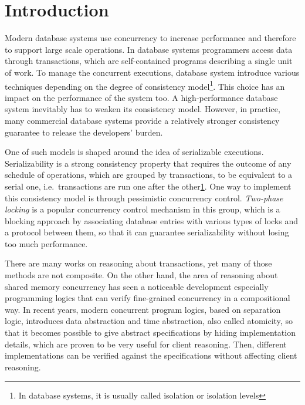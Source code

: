 \chapter{Introduction}

Modern database systems use concurrency to increase performance and therefore to support large scale operations. In database systems programmers access data through transactions, which are self-contained programs describing a single unit of work. To manage the concurrent executions, database system introduce various techniques depending on the degree of consistency model\footnote{In database systems, it is usually called isolation or isolation levels}. This choice has an impact on the performance of the system too. A high-performance database system inevitably has to weaken its consistency model. However, in practice, many commercial database systems provide a relatively stronger consistency guarantee to release the developers' burden.

One of such models is shaped around the idea of serializable executions. Serializability is a strong consistency property that requires the outcome of any schedule of operations, which are grouped by transactions, to be equivalent to a serial one, i.e.\ transactions are run one after the other\ref{}. One way to implement this consistency model is through pessimistic concurrency control. \textit{Two-phase locking} is a popular concurrency control mechanism in this group, which is a blocking approach by associating database entries with various types of locks and a protocol between them, so that it can guarantee serializability without losing too much performance.

There are many works on reasoning about transactions, yet many of those methods are not composite. On the other hand, the area of reasoning about shared memory concurrency has seen a noticeable development especially programming logics that can verify fine-grained concurrency in a compositional way. In recent years, modern concurrent program logics, based on separation logic, introduces data abstraction and time abstraction, also called atomicity, so that it becomes possible to give abstract specifications by hiding implementation details, which are proven to be very useful for client reasoning.
Then, different implementations can be verified against the specifications without affecting client reasoning.

